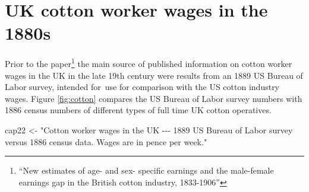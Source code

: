 \documentclass[
  10pt,
  b5paper]{book}
\newenvironment{Shaded}{\begin{snugshade}}{\end{snugshade}}
\newcommand{\NormalTok}[1]{#1}
\newcommand{\OtherTok}[1]{\textcolor[rgb]{0.56,0.35,0.01}{#1}}
\newcommand{\StringTok}[1]{\textcolor[rgb]{0.31,0.60,0.02}{#1}}
\begin{document}
\hypertarget{uk-cotton-worker-wages-in-the-1880s}{%
\section{UK cotton worker wages in the 1880s}\label{uk-cotton-worker-wages-in-the-1880s}}

Prior to the \citet{boot2008new} paper\footnote{``New estimates of age- and sex- specific
  earnings and the male-female earnings gap in the British cotton
  industry, 1833-1906''} the main source of published information on
cotton worker wages in the UK in the late 19th century were results
from an 1889 US Bureau of Labor survey, intended for~use for
comparison with the US cotton industry wages.
Figure \ref{fig:cotton} compares the US Bureau of Labor survey
numbers with 1886 census numbers of different types of full time
UK cotton operatives.

\begin{Shaded}
\begin{Highlighting}[]
\NormalTok{cap22 }\OtherTok{\textless{}{-}} \StringTok{"Cotton worker wages in the UK {-}{-}{-} 1889 US Bureau of Labor \textquotesingle{}survey\textquotesingle{}}
\StringTok{versus 1886 census data. Wages are in pence per week."}
\end{Highlighting}
\end{Shaded}
\end{document}
